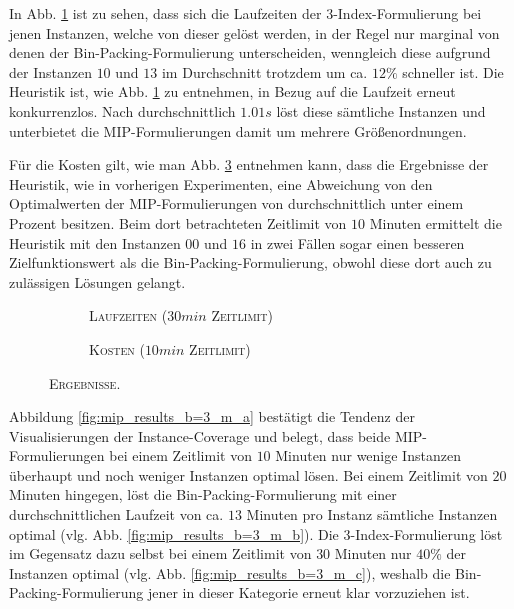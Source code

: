 In Abb. \ref{fig:b=3_m_runtimes} ist zu sehen, dass sich die Laufzeiten der 3-Index-Formulierung bei jenen Instanzen,
welche von dieser gelöst werden, in der Regel nur marginal von denen der Bin-Packing-Formulierung unterscheiden,
wenngleich diese aufgrund der Instanzen $10$ und $13$ im Durchschnitt trotzdem um ca. $12 \%$ schneller ist.\newline
Die Heuristik ist, wie Abb. \ref{fig:b=3_m_runtimes} zu entnehmen, in Bezug auf die Laufzeit erneut konkurrenzlos.
Nach durchschnittlich $1.01s$ löst diese sämtliche Instanzen und unterbietet die MIP-Formulierungen damit um mehrere Größenordnungen.

Für die Kosten gilt, wie man Abb. \ref{fig:b=3_m_costs} entnehmen kann, dass die Ergebnisse der Heuristik,
wie in vorherigen Experimenten, eine Abweichung von den Optimalwerten der MIP-Formulierungen von durchschnittlich
unter einem Prozent besitzen. Beim dort betrachteten Zeitlimit von $10$ Minuten ermittelt die Heuristik mit den
Instanzen $00$ und $16$ in zwei Fällen sogar einen besseren Zielfunktionswert als die Bin-Packing-Formulierung,
obwohl diese dort auch zu zulässigen Lösungen gelangt.

\begin{figure}[H]
\centering
\begin{subfigure}[b]{0.4\textwidth}
\centering
\caption{\textsc{Laufzeiten ($30min$ Zeitlimit)}}
\label{fig:b=3_m_runtimes}
\end{subfigure}
\hfill
\begin{subfigure}[b]{0.4\textwidth}
\centering
\caption{\textsc{Kosten ($10min$ Zeitlimit)}}
\label{fig:b=3_m_costs}
\end{subfigure}
\caption{\textsc{Ergebnisse}.}
\end{figure}

Abbildung \ref{fig:mip_results_b=3_m_a} bestätigt die Tendenz der Visualisierungen der Instance-Coverage und belegt,
dass beide MIP-Formulierungen bei einem Zeitlimit von $10$ Minuten nur wenige Instanzen überhaupt und noch weniger
Instanzen optimal lösen.
Bei einem Zeitlimit von $20$ Minuten hingegen, löst die Bin-Packing-Formulierung mit einer durchschnittlichen
Laufzeit von ca. $13$ Minuten pro Instanz sämtliche Instanzen optimal (vlg. Abb. \ref{fig:mip_results_b=3_m_b}).
Die 3-Index-Formulierung löst im Gegensatz dazu selbst bei einem Zeitlimit von $30$ Minuten nur $40 \%$ der Instanzen
optimal (vlg. Abb. \ref{fig:mip_results_b=3_m_c}), weshalb die Bin-Packing-Formulierung jener in dieser Kategorie erneut
klar vorzuziehen ist.

